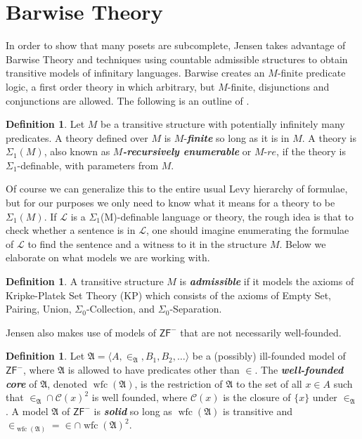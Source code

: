 \documentclass{amsart}
\theoremstyle{definition}
\newtheorem{definition}[theorem]{Definition}
\theoremstyle{remark}
\DeclareMathOperator{\wfc}{wfc}
\begin{document}
\section{Barwise Theory}
\label{sec:BarwiseTheory}
In order to show that many posets are subcomplete, Jensen takes advantage of Barwise Theory and techniques using countable admissible structures to obtain transitive models of infinitary languages. Barwise creates an $M$-finite predicate logic, a first order theory in which arbitrary, but $M$-finite, disjunctions and conjunctions are allowed. The following is an outline of \cite[Chapter 1 \& 2]{Jensen:2012fr}. 

\begin{definition} Let $M$ be a transitive structure with potentially infinitely many predicates. A theory defined over $M$ is $M$-\textbf{\textit{finite}} so long as it is in $M$. A theory is $\Sigma_1(M)$, also known as \textbf{\textit{$M$-recursively enumerable}} or $M$-$re$, if the theory is $\Sigma_1$-definable, with parameters from $M$. \end{definition}
Of course we can generalize this to the entire usual Levy hierarchy of formulae, but for our purposes we only need to know what  it means for a theory to be $\Sigma_1(M)$. If $\mathcal L$ is a $\Sigma_1$(M)-definable language or theory, the rough idea is that to check whether a sentence is in $\mathcal L$, one should imagine enumerating the formulae of $\mathcal L$ to find the sentence and a witness to it in the structure $M$. Below we elaborate on what models we are working with. %

\begin{definition} A transitive structure $M$ is \textbf{\emph{admissible}} if it models the axioms of \textsf{Kripke-Platek Set Theory} (\textsf{KP}) which consists of the axioms of \textsf{Empty Set}, \textsf{Pairing}, \textsf{Union}, $\Sigma_0$-\textsf{Collection}, and $\Sigma_0$-\textsf{Separation}. \end{definition}

Jensen also makes use of models of $\textsf{ZF}^-$ that are not necessarily well-founded.
\begin{definition} Let $\mathfrak A = \langle A, \in_{\mathfrak A}, B_1, B_2, \dots \rangle$ be a (possibly) ill-founded model  of $\textsf{ZF}^-$, where $\mathfrak A$ is allowed to have predicates other than $\in$. The \textbf{\emph{well-founded core}} of $\mathfrak A$, denoted $\wfc(\mathfrak A)$, is the restriction of $\mathfrak A$ to the set of all $x \in A$ such that $\in_{\mathfrak A} \cap \mathcal C(x)^2$ is well founded, where $\mathcal C(x)$ is the closure of $\{x\}$ under $\in_{\mathfrak A}$. A model $\mathfrak A$ of $\textsf{ZF}^-$ is \textbf{\emph{solid}} so long as $\wfc(\mathfrak A)$ is transitive and $\in_{\wfc(\mathfrak A)}=\in \cap \wfc(\mathfrak A)^2$. \end{definition}
\end{document}
